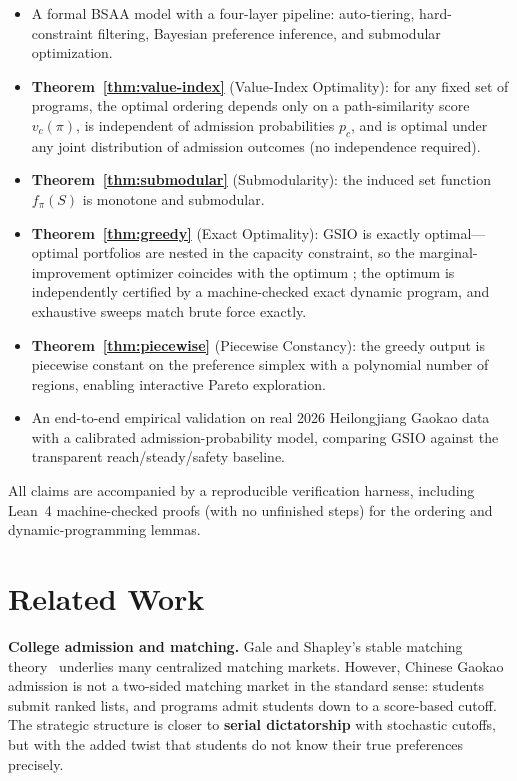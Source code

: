 \documentclass[11pt,a4paper]{article}
\begin{document}
\begin{itemize}
  \item A formal BSAA model with a four-layer pipeline: auto-tiering, hard-constraint filtering, Bayesian preference inference, and submodular optimization.
  \item \textbf{Theorem~\ref{thm:value-index}} (Value-Index Optimality): for any fixed set of programs, the optimal ordering depends only on a path-similarity score $v_c(\pi)$, is independent of admission probabilities $p_c$, and is optimal under any joint distribution of admission outcomes (no independence required).
  \item \textbf{Theorem~\ref{thm:submodular}} (Submodularity): the induced set function $f_\pi(S)$ is monotone and submodular.
  \item \textbf{Theorem~\ref{thm:greedy}} (Exact Optimality): GSIO is exactly optimal---optimal portfolios are nested in the capacity constraint, so the marginal-improvement optimizer coincides with the optimum \citep{chade2006simultaneous,kapur2022college}; the optimum is independently certified by a machine-checked exact dynamic program, and exhaustive sweeps match brute force exactly.
  \item \textbf{Theorem~\ref{thm:piecewise}} (Piecewise Constancy): the greedy output is piecewise constant on the preference simplex with a polynomial number of regions, enabling interactive Pareto exploration.
  \item An end-to-end empirical validation on real 2026 Heilongjiang Gaokao data with a calibrated admission-probability model, comparing GSIO against the transparent reach/steady/safety baseline.
\end{itemize}

All claims are accompanied by a reproducible verification harness, including Lean~4 machine-checked proofs (with no unfinished steps) for the ordering and dynamic-programming lemmas.

\section{Related Work}\label{sec:related}

\textbf{College admission and matching.} Gale and Shapley's stable matching theory~\citep{gale1962college} underlies many centralized matching markets. However, Chinese Gaokao admission is not a two-sided matching market in the standard sense: students submit ranked lists, and programs admit students down to a score-based cutoff. The strategic structure is closer to \textbf{serial dictatorship} with stochastic cutoffs, but with the added twist that students do not know their true preferences precisely.
\end{document}
